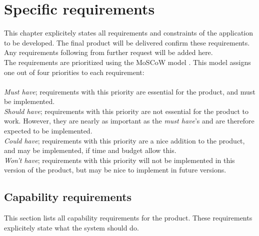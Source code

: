 \chapter{Specific requirements}

This chapter explicitely states all requirements and constraints of the application to be developed. The final product will be delivered confirm these requirements. Any requirements following from further request will be added here. \\
The requirements are prioritized using the MoSCoW model \cite{moscow}. This model assigns one out of four priorities to each requirement: \\
\\
\emph{Must have}; requirements with this priority are essential for the product, and must be implemented. \\
\emph{Should have}; requirements with this priority are not essential for the product to work. However, they are nearly as important as the \emph{must have}'s and are therefore expected to be implemented. \\
\emph{Could have}; requirements with this priority are a nice addition to the product, and may be implemented, if time and budget allow this. \\
\emph{Won't have}; requirements with this priority will not be implemented in this version of the product, but may be nice to implement in future versions.\\

\section{Capability requirements}
This section lists all capability requirements for the product. These requirements explicitely state what the system should do. \\

